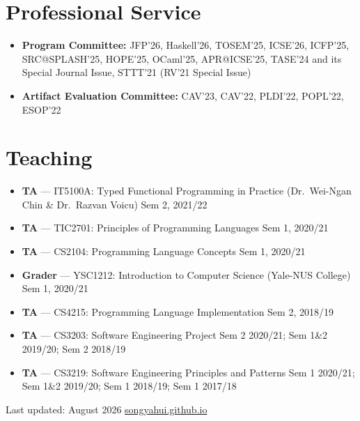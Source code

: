 \documentclass[11pt, a4paper]{article}
\begin{document}
\section{Professional Service}

\begin{itemize}

  \item \textbf{Program Committee:}
        JFP'26, Haskell'26, TOSEM'25, ICSE'26, ICFP'25, SRC@SPLASH'25, HOPE'25, OCaml'25,
        APR@ICSE'25, TASE'24 and its Special Journal Issue,
        STTT'21 (RV'21 Special Issue)

  \item \textbf{Artifact Evaluation Committee:}
        CAV'23, CAV'22, PLDI'22, POPL'22, ESOP'22

\end{itemize}

\section{Teaching}

\begin{itemize}

  \item \textbf{TA} --- IT5100A: Typed Functional Programming in Practice
        (Dr.\ Wei-Ngan Chin \& Dr.\ Razvan Voicu)
        \hfill Sem 2, 2021/22

  \item \textbf{TA} --- TIC2701: Principles of Programming Languages
        \hfill Sem 1, 2020/21

  \item \textbf{TA} --- CS2104: Programming Language Concepts
        \hfill Sem 1, 2020/21

  \item \textbf{Grader} --- YSC1212: Introduction to Computer Science (Yale-NUS College)
        \hfill Sem 1, 2020/21

  \item \textbf{TA} --- CS4215: Programming Language Implementation
        \hfill Sem 2, 2018/19

  \item \textbf{TA} --- CS3203: Software Engineering Project
        \hfill Sem 2 2020/21; Sem 1\&2 2019/20; Sem 2 2018/19

  \item \textbf{TA} --- CS3219: Software Engineering Principles and Patterns
        \hfill Sem 1 2020/21; Sem 1\&2 2019/20; Sem 1 2018/19; Sem 1 2017/18

\end{itemize}


\vfill
\begin{center}
  \textcolor{clrmuted}{\footnotesize Last updated: August 2026 \quad
  \href{https://songyahui.github.io}{songyahui.github.io}}
\end{center}
\end{document}
